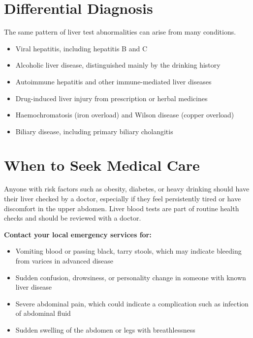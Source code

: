 \section*{Differential Diagnosis}
The same pattern of liver test abnormalities can arise from many conditions.
\begin{itemize}
    \item Viral hepatitis, including hepatitis B and C
    \item Alcoholic liver disease, distinguished mainly by the drinking history
    \item Autoimmune hepatitis and other immune-mediated liver diseases
    \item Drug-induced liver injury from prescription or herbal medicines
    \item Haemochromatosis (iron overload) and Wilson disease (copper overload)
    \item Biliary disease, including primary biliary cholangitis
\end{itemize}

\section*{When to Seek Medical Care}
Anyone with risk factors such as obesity, diabetes, or heavy drinking should have their liver checked by a doctor, especially if they feel persistently tired or have discomfort in the upper abdomen. Liver blood tests are part of routine health checks and should be reviewed with a doctor.

\textbf{Contact your local emergency services for:}
\begin{itemize}
    \item Vomiting blood or passing black, tarry stools, which may indicate bleeding from varices in advanced disease
    \item Sudden confusion, drowsiness, or personality change in someone with known liver disease
    \item Severe abdominal pain, which could indicate a complication such as infection of abdominal fluid
    \item Sudden swelling of the abdomen or legs with breathlessness
\end{itemize}

